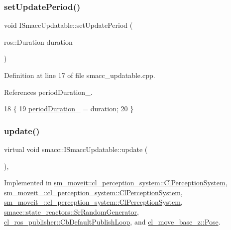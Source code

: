 \subsubsection{\texorpdfstring{set\+Update\+Period()}{setUpdatePeriod()}}
{\footnotesize\ttfamily void I\+Smacc\+Updatable\+::set\+Update\+Period (\begin{DoxyParamCaption}\item[{ros\+::\+Duration}]{duration }\end{DoxyParamCaption})}



Definition at line 17 of file smacc\+\_\+updatable.\+cpp.



References period\+Duration\+\_\+.


\begin{DoxyCode}
18 \{
19     \hyperlink{classsmacc_1_1ISmaccUpdatable_ad02d9798ac5609f3ecb9fb8a46febc18}{periodDuration\_} = duration;
20 \}
\end{DoxyCode}
\mbox{\label{classsmacc_1_1ISmaccUpdatable_a84ee0520cbefdb1d412bed54650b028e}} 
\subsubsection{\texorpdfstring{update()}{update()}}
{\footnotesize\ttfamily virtual void smacc\+::\+I\+Smacc\+Updatable\+::update (\begin{DoxyParamCaption}{ }\end{DoxyParamCaption})\hspace{0.3cm}{\ttfamily [protected]}, {}}



Implemented in \hyperlink{classsm__moveit_1_1cl__perception__system_1_1ClPerceptionSystem_aaefca9001d3836655d38ee92621c013e}{sm\+\_\+moveit\+::cl\+\_\+perception\+\_\+system\+::\+Cl\+Perception\+System}, \hyperlink{classsm__moveit__2_1_1cl__perception__system_1_1ClPerceptionSystem_a0efca38be333f667cc789dce522a72e3}{sm\+\_\+moveit\+\_\+::cl\+\_\+perception\+\_\+system\+::\+Cl\+Perception\+System}, \hyperlink{classsm__moveit__3_1_1cl__perception__system_1_1ClPerceptionSystem_a53ce2f7a00275f8c1ce4a0e640bbe3d8}{sm\+\_\+moveit\+\_\+::cl\+\_\+perception\+\_\+system\+::\+Cl\+Perception\+System}, \hyperlink{classsmacc_1_1state__reactors_1_1SrRandomGenerator_adf6e20208210f30639b92214e1dda83b}{smacc\+::state\+\_\+reactors\+::\+Sr\+Random\+Generator}, \hyperlink{classcl__ros__publisher_1_1CbDefaultPublishLoop_aef241d1976f0105643976545880d5e21}{cl\+\_\+ros\+\_\+publisher\+::\+Cb\+Default\+Publish\+Loop}, and \hyperlink{classcl__move__base__z_1_1Pose_abf99d1127cf51a93f97ada2031196114}{cl\+\_\+move\+\_\+base\+\_\+z\+::\+Pose}.



